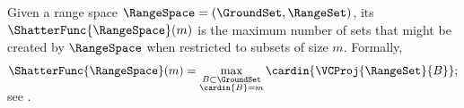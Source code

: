 \begin {defn} Given a range space $\RangeSpace = (\GroundSet , \RangeSet )$, its  $\ShatterFunc {\RangeSpace }(m)$ is the maximum number of sets that might be created by $\RangeSpace $ when restricted to subsets of size $m$. Formally, \begin {equation*} \ShatterFunc {\RangeSpace }(m)=\smash {\max _{\substack {B \subset \GroundSet \\ \cardin {B} = m}} \cardin { \VCProj {\RangeSet }{B} }}; \end {equation*} see . \end {defn}
